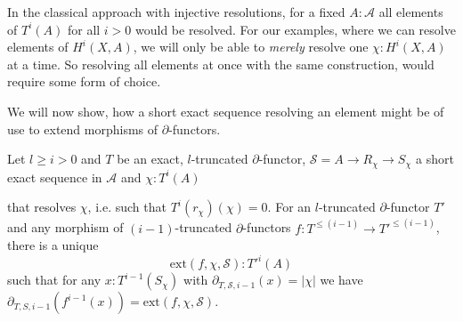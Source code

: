 In the classical approach with injective resolutions,
for a fixed $A:\mathcal A$ all elements of $T^i(A)$ for all $i>0$ would be resolved.
For our examples, where we can resolve elements of $H^i(X,A)$,
we will only be able to \emph{merely} resolve one $\chi:H^i(X,A)$ at a time.
So resolving all elements at once with the same construction, would require some form of choice.

We will now show,
how a short exact sequence resolving an element might be of use to extend morphisms of $\partial$-functors.

\begin{lemma}
  \label{lem:extend-map}
  Let $l\geq i>0$ and $T$ be an exact, $l$-truncated $\partial$-functor, $\mathcal{S}=A\to R_\chi\to S_\chi$ a short exact sequence in $\mathcal A$
  and $\chi:T^i(A)$
  \begin{center}
  \end{center}
  that resolves $\chi$, i.e. such that $T^i(r_\chi)(\chi)=0$.
  For an $l$-truncated $\partial$-functor $T'$
  and any morphism of $(i-1)$-truncated $\partial$-functors $f:T^{\leq (i-1)}\to T'^{\leq (i-1)}$,
  there is a unique
  \[\mathrm{ext}(f,\chi,\mathcal{S}) : T'^i(A)\]
  such that for any $x:T^{i-1}(S_\chi)$ with $\partial_{T,\mathcal{S},i-1}(x)=|\chi|$ we have $\partial_{T,S,i-1}(f^{i-1}(x))=\mathrm{ext}(f,\chi,\mathcal{S})$.
\end{lemma}

